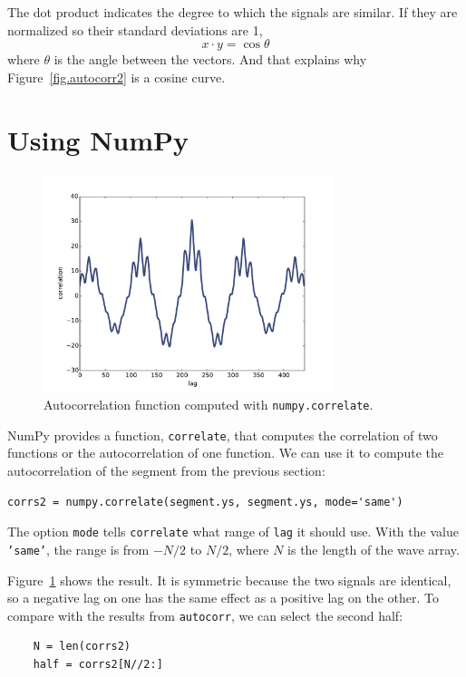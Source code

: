 \documentclass[12pt]{book}
\begin{document}
The dot product indicates the degree to which the signals are similar.
If they are normalized so their standard deviations are 1,
%
\[ x \cdot y = \cos \theta \]
%
where $\theta$ is the angle between the vectors.  And that explains
why Figure~\ref{fig.autocorr2} is a cosine curve.


\section{Using NumPy}
\label{correlate}

\begin{figure}
\centerline{\includegraphics[height=2.5in]{figs/autocorr9.pdf}}
\caption{Autocorrelation function computed with {\tt numpy.correlate}.}
\label{fig.autocorr9}
\end{figure}

NumPy provides a function, {\tt correlate}, that computes
the correlation of two functions or the autocorrelation of one
function.  We can use it to compute the autocorrelation of
the segment from the previous section:

\begin{verbatim}
corrs2 = numpy.correlate(segment.ys, segment.ys, mode='same')
\end{verbatim}

The option {\tt mode} tells {\tt correlate} what range
of {\tt lag} it should use.  With the value {\tt 'same'}, the
range is from $-N/2$ to $N/2$, where $N$ is the length of the
wave array.

Figure~\ref{fig.autocorr9} shows the result.  It is symmetric because
the two signals are identical, so a negative lag on one has the same
effect as a positive lag on the other.  To compare with the results
from {\tt autocorr}, we can select the second half:

\begin{verbatim}
    N = len(corrs2)
    half = corrs2[N//2:]
\end{verbatim}
\end{document}
